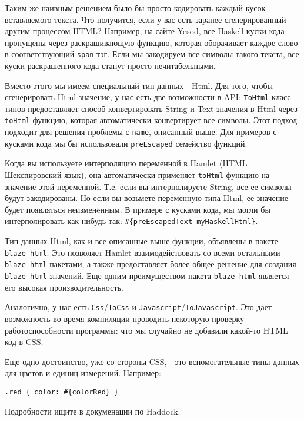 Таким же наивным решением было бы просто кодировать каждый кусок 
вставляемого текста. Что получится, если у вас есть заранее сгенерированный 
другим процессом HTML? Например, на сайте Yesod, все Haskell-куски кода 
пропущены через раскрашивающую функцию, которая оборачивает каждое слово
в соответствующий \texttt{span}-тэг. Если мы закодируем все символы такого 
текста, все куски раскрашенного кода станут просто нечитабельными.

Вместо этого мы имеем специальный тип данных - Html. Для того, чтобы сгенерировать
Html значение, у нас есть две возможности в API: \lstinline!ToHtml! класс типов
предоставляет способ конвертировать String и Text значения в Html через 
\lstinline!toHtml! функцию, которая автоматически конвертирует все символы.
Этот подход подходит для решения проблемы с \texttt{name}, описанный выше. Для
примеров с кусками кода мы бы использовали \lstinline!preEscaped! 
семейство функций.

Когда вы используете интерполяцию переменной в Hamlet (HTML Шекспировский язык), 
она автоматически применяет \lstinline!toHtml! функцию на значение 
этой переменной. Т.е. если вы интерполируете String, все ее символы 
будут закодированы. Но если вы возьмете переменную типа Html, ее значение
будет появляться неизменëнным. В примере с кусками кода, мы могли бы 
интерполировать как-нибудь так: \lstinline!#{preEscapedText myHaskellHtml}!.

Тип данных Html, как и все описанные выше функции, объявлены в пакете 
\texttt{blaze-html}. Это позволяет Hamlet взаимодействовать со всеми 
остальными \texttt{blaze-html} пакетами, а также предоставляет 
более общее решение для создания \texttt{blaze-html} значений. 
Еще одним преимуществом пакета \texttt{blaze-html} является 
его высокая производительность.

Аналогично, у нас есть \lstinline!Css!/\lstinline!ToCss! и 
\lstinline!Javascript!/\lstinline!ToJavascript!. Это дает возможность во время
компиляции проводить некоторую проверку работоспособности программы: что мы 
случайно не добавили какой-то HTML код в CSS.

Еще одно достоинство, уже со стороны CSS, - это вспомогательные типы данных для 
цветов и единиц измерений. Например: 

\begin{lstlisting}
.red { color: #{colorRed} }
\end{lstlisting}

Подробности ищите в докуменации по Haddock.

